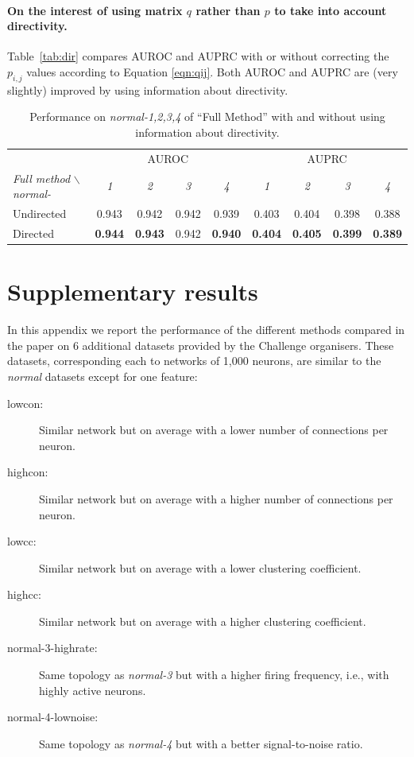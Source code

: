 \documentclass[wcp]{jmlr}
\begin{document}
\paragraph{On the interest of using matrix $q$ rather than $p$ to take into account directivity.}

Table~\ref{tab:dir} compares AUROC and AUPRC with or without correcting the $p_{i,j}$ values according to Equation \ref{eqn:qij}. Both AUROC and AUPRC are (very slightly) improved by using information about directivity.

\begin{table}[ht]\label{tab:dir}
\caption{Performance on \textit{normal-1,2,3,4} of ``Full Method'' with and
  without using information about directivity.}
\label{tab:directivity}

\centering
\small
\begin{tabular}{| l | c c c c | c c c c |}
\hline
& \multicolumn{4}{c|}{AUROC} & \multicolumn{4}{c|}{AUPRC} \\
\textit{Full method} $\backslash$ \textit{normal-} & \textit{1} & \textit{2} & \textit{3} & \textit{4} & \textit{1} & \textit{2} & \textit{3} & \textit{4} \\
\hline
\hline
 Undirected & 0.943 & 0.942 & 0.942 & 0.939 & 0.403 & 0.404 & 0.398 & 0.388  \\
  Directed & \textbf{0.944} & \textbf{0.943} & 0.942 & \textbf{0.940} & \textbf{0.404} & \textbf{0.405} & \textbf{0.399} & \textbf{0.389}\\
\hline
\end{tabular}
\end{table}


\section{Supplementary results} \label{app:supp}

In this appendix we report the performance of the different methods compared
in the paper on 6 additional datasets provided by the Challenge
organisers. These datasets, corresponding each to networks of 1,000 neurons, are similar to
the \textit{normal} datasets except for one feature:
\begin{description}
\item[lowcon:] Similar network but on average with a lower number of connections per neuron.
\item[highcon:] Similar network but on average with a higher number of connections per neuron.
\item[lowcc:] Similar network but on average with a lower clustering coefficient.
\item[highcc:] Similar network but on average with a higher clustering coefficient.
\item[normal-3-highrate:] Same topology as \textit{normal-3} but with a higher firing frequency, i.e., with highly active neurons.
\item[normal-4-lownoise:] Same topology as \textit{normal-4} but with a better signal-to-noise ratio.
\end{description}
\end{document}
